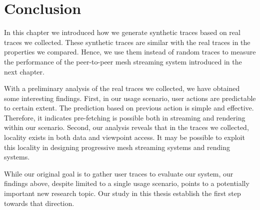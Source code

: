 \section{Conclusion}
In this chapter we introduced how we generate synthetic traces based on real traces we collected.
These synthetic traces are similar with the real traces in the properties we compared.
Hence, we use them instead of random traces to measure the performance of the peer-to-peer 
mesh streaming system introduced in the next chapter.

With a preliminary analysis of the real traces we collected, we have obtained some
interesting findings.
First, in our usage scenario, user actions are predictable to certain extent. 
The prediction based on previous action is simple and effective. 
Therefore, it indicates pre-fetching is possible both in streaming and rendering within our scenario.
Second, our analysis reveals that in the traces we collected, 
locality exists in both data and viewpoint access. 
It may be possible to exploit this locality in 
designing progressive mesh streaming systems and rending systems.

While our original goal is to gather user traces to evaluate our system, 
our findings above, despite limited to a single usage scenario, 
points to a potentially important new research topic.  
Our study in this thesis establish the first step towards that direction.
